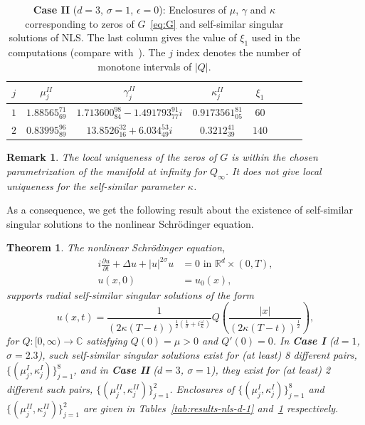 \documentclass[11pt]{article}
\newtheorem{remark}[definition]{Remark}
\newtheorem{theorem}[definition]{Theorem}
\begin{document}
\begin{table}[ht]
  \centering
  \begin{tabular}{cccccccc}
    \toprule
    \(j\) & \(\mu_{j}^{II}\) & \(\gamma_{j}^{II}\) & \(\kappa_{j}^{II}\) & \(\xi_{1}\)\\
    \midrule
    \(1\) & \(1.88565_{69}^{71}\) & \(1.713600_{84}^{98} - 1.491793_{77}^{91} i\) & \(0.9173561_{05}^{81}\) & \(60\)\\
    \(2\) & \(0.83995_{89}^{96}\) & \(13.8526_{16}^{32} + 6.034_{49}^{53} i\) & \(0.3212_{39}^{41}\) & \(140\)\\
    \bottomrule
  \end{tabular}
  \caption{\textbf{Case II} (\(d = 3\), \(\sigma = 1\),
    \(\epsilon = 0\)): Enclosures of \(\mu\), \(\gamma\) and
    \(\kappa\) corresponding to zeros of \(G\)~\eqref{eq:G} and
    self-similar singular solutions of NLS. The last column gives the
    value of \(\xi_{1}\) used in the computations (compare
    with~\cite[Table 3.5]{Plech2001}). The $j$ index denotes the number of monotone intervals of $|Q|$.}
  \label{tab:results-nls-d-3}
\end{table}

\begin{remark}
  The local uniqueness of the zeros of \(G\) is within the chosen
  parametrization of the manifold at infinity for \(Q_{\infty}\). It
  does not give local uniqueness for the self-similar parameter
  \(\kappa\).
\end{remark}

As a consequence, we get the following result about the existence of
self-similar singular solutions to the nonlinear Schrödinger
equation.
\begin{theorem}
  \label{thm:existence-nls}
  The nonlinear Schrödinger equation,
  \begin{align*}
    i \frac{\partial u}{\partial t} + \Delta u + |u|^{2\sigma}u &= 0 \text{ in } \mathbb{R}^{d} \times (0, T),\\
    u(x, 0) &= u_{0}(x),
  \end{align*}
  supports radial self-similar singular solutions of the form
  \begin{equation*}
    u(x, t) = \dfrac{1}{(2\kappa(T - t))^{\frac{1}{2}\left(\frac{1}{\sigma} + i \frac{\omega}{\kappa}\right)}}
    Q\left(\dfrac{|x|}{(2\kappa(T - t))^{\frac{1}{2}}}\right),
  \end{equation*}
  for \(Q \colon [0, \infty) \to \mathbb{C}\) satisfying \(Q(0) = \mu > 0\)
  and \(Q'(0) = 0\). In \textbf{Case I} (\(d = 1\), \(\sigma = 2.3\)),
  such self-similar singular solutions exist for (at least) 8
  different pairs, \(\{(\mu_{j}^{I}, \kappa_{j}^{I})\}_{j = 1}^{8}\),
  and in \textbf{Case II} (\(d = 3\), \(\sigma = 1\)), they exist for
  (at least) 2 different such pairs,
  \(\{(\mu_{j}^{II}, \kappa_{j}^{II})\}_{j = 1}^{2}\). Enclosures of
  \(\{(\mu_{j}^{I}, \kappa_{j}^{I})\}_{j = 1}^{8}\) and
  \(\{(\mu_{j}^{II}, \kappa_{j}^{II})\}_{j = 1}^{2}\) are given in
  Tables~\ref{tab:results-nls-d-1} and~\ref{tab:results-nls-d-3}
  respectively.
\end{theorem}
\end{document}
